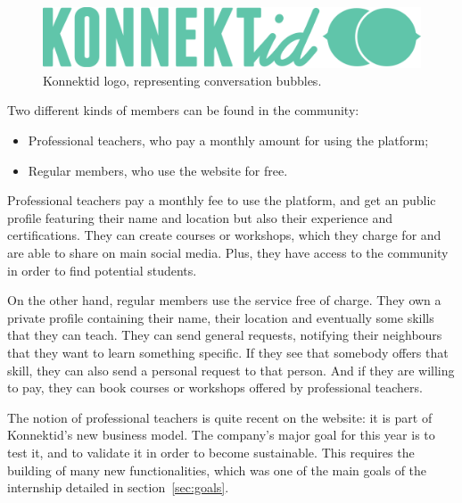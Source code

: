 \begin{figure}[h]
    \centering
    \includegraphics[scale=0.6]{figure/logo_konnektid.png}
    \caption{Konnektid logo, representing conversation bubbles.}
    \label{fig:logoKonnektid}
\end{figure}

Two different kinds of members can be found in the community:

\begin{itemize}[noitemsep]
    \item Professional teachers, who pay a monthly amount for using the platform;
    \item Regular members, who use the website for free.
\end{itemize}

Professional teachers pay a monthly fee to use the platform, and get an public profile featuring their name and location but also their experience and certifications.
They can create courses or workshops, which they charge for and are able to share on main social media.
Plus, they have access to the community in order to find potential students.

On the other hand, regular members use the service free of charge. They own a private profile containing their name, their location and eventually some skills that they can teach.
They can send general requests, notifying their neighbours that they want to learn something specific.
If they see that somebody offers that skill, they can also send a personal request to that person.
And if they are willing to pay, they can book courses or workshops offered by professional teachers.

The notion of professional teachers is quite recent on the website: it is part of Konnektid's new business model.
The company's major goal for this year is to test it, and to validate it in order to become sustainable.
This requires the building of many new functionalities, which was one of the main goals of the internship detailed in {\sc section}~\ref{sec:goals}.
